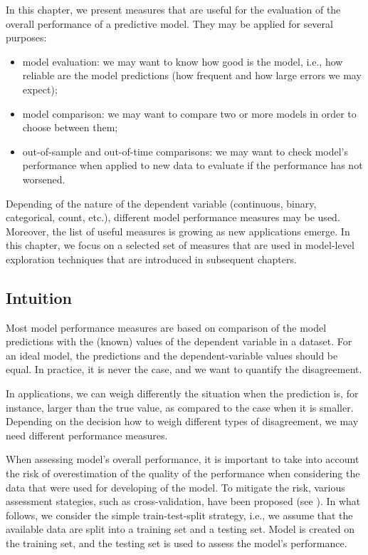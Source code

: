 \documentclass[12pt,]{krantz}
\providecommand{\tightlist}{%
  \setlength{\itemsep}{0pt}\setlength{\parskip}{0pt}}
\begin{document}
In this chapter, we present measures that are useful for the evaluation of the overall performance of a predictive model. They may be applied for several purposes:

\begin{itemize}
\tightlist
\item
  model evaluation: we may want to know how good is the model, i.e., how reliable are the model predictions (how frequent and how large errors we may expect);
\item
  model comparison: we may want to compare two or more models in order to choose between them;
\item
  out-of-sample and out-of-time comparisons: we may want to check model's performance when applied to new data to evaluate if the performance has not worsened.
\end{itemize}

Depending of the nature of the dependent variable (continuous, binary, categorical, count, etc.), different model performance measures may be used. Moreover, the list of useful measures is growing as new applications emerge. In this chapter, we focus on a selected set of measures that are used in model-level exploration techniques that are introduced in subsequent chapters.

\hypertarget{modelPerformanceIntuition}{%
\subsection{Intuition}\label{modelPerformanceIntuition}}

Most model performance measures are based on comparison of the model predictions with the (known) values of the dependent variable in a dataset. For an ideal model, the predictions and the dependent-variable values should be equal. In practice, it is never the case, and we want to quantify the disagreement.

In applications, we can weigh differently the situation when the prediction is, for instance, larger than the true value, as compared to the case when it is smaller. Depending on the decision how to weigh different types of disagreement, we may need different performance measures.

When assessing model's overall performance, it is important to take into account the risk of overestimation of the quality of the performance when considering the data that were used for developing of the model. To mitigate the risk, various assessment stategies, such as cross-validation, have been proposed (see \citep{AppliedPredictiveModeling2013}). In what follows, we consider the simple train-test-split strategy, i.e., we assume that the available data are split into a training set and a testing set. Model is created on the training set, and the testing set is used to assess the model's performance.
\end{document}
